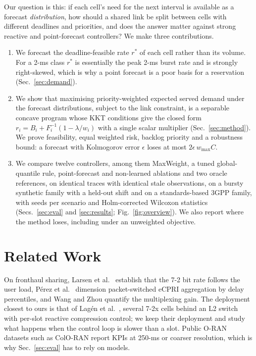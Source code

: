 \documentclass[conference]{IEEEtran}
\begin{document}
Our question is this: if each cell's need for the next interval is available as a forecast \emph{distribution}, how should a shared link be split between cells with different deadlines and priorities, and does the answer matter against strong reactive and point-forecast controllers? We make three contributions.
\begin{enumerate}
\item We forecast the deadline-feasible rate $r^\ast$ of each cell rather than its volume. For a 2-ms class $r^\ast$ is essentially the peak 2-ms burst rate and is strongly right-skewed, which is why a point forecast is a poor basis for a reservation (Sec.~\ref{sec:demand}).
\item We show that maximising priority-weighted expected served demand under the forecast distributions, subject to the link constraint, is a separable concave program whose KKT conditions give the closed form $r_i = B_i + F_i^{-1}(1-\lambda/w_i)$ with a single scalar multiplier (Sec.~\ref{sec:method}). We prove feasibility, equal weighted risk, backlog priority and a robustness bound: a forecast with Kolmogorov error $\epsilon$ loses at most $2\epsilon\, w_{\max} C$.
\item We compare twelve controllers, among them MaxWeight, a tuned global-quantile rule, point-forecast and non-learned ablations and two oracle references, on identical traces with identical stale observations, on a bursty synthetic family with a held-out shift and on a standards-based 3GPP family, with \nSeeds{} seeds per scenario and Holm-corrected Wilcoxon statistics (Secs.~\ref{sec:eval} and \ref{sec:results}; Fig.~\ref{fig:overview}). We also report where the method loses, including under an unweighted objective.
\end{enumerate}

\section{Related Work}
\label{sec:related}
On fronthaul sharing, Larsen et al.\ \cite{larsen2019} establish that the 7-2 bit rate follows the user load, P\'erez et al.\ \cite{perez2018} dimension packet-switched eCPRI aggregation by delay percentiles, and Wang and Zhou \cite{wang2017} quantify the multiplexing gain. The deployment closest to ours is that of Lag\'en et al.\ \cite{lagen2022}, several 7-2x cells behind an L2 switch with per-slot reactive compression control; we keep their deployment and study what happens when the control loop is slower than a slot. Public O-RAN datasets such as ColO-RAN \cite{colo_ran} report KPIs at 250-ms or coarser resolution, which is why Sec.~\ref{sec:eval} has to rely on models.
\end{document}
